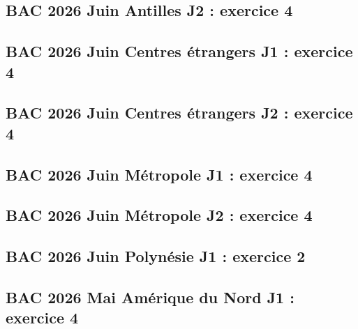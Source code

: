 \documentclass[lang=fr,edition=teacher,layout=sheet]{mxbook}
\begin{document}
\begingroup\endgroup
\par\bigskip
{}\subsection*{BAC 2026 Juin Antilles J2 : exercice 4}
\begingroup\endgroup
\par\bigskip
{}\subsection*{BAC 2026 Juin Centres étrangers J1 : exercice 4}
\begingroup\endgroup
\par\bigskip
{}\subsection*{BAC 2026 Juin Centres étrangers J2 : exercice 4}
\begingroup\endgroup
\par\bigskip
{}\subsection*{BAC 2026 Juin Métropole J1 : exercice 4}
\begingroup\endgroup
\par\bigskip
{}\subsection*{BAC 2026 Juin Métropole J2 : exercice 4}
\begingroup\endgroup
\par\bigskip
{}\subsection*{BAC 2026 Juin Polynésie J1 : exercice 2}
\begingroup\endgroup
\par\bigskip
{}\subsection*{BAC 2026 Mai Amérique du Nord J1 : exercice 4}
\end{document}
